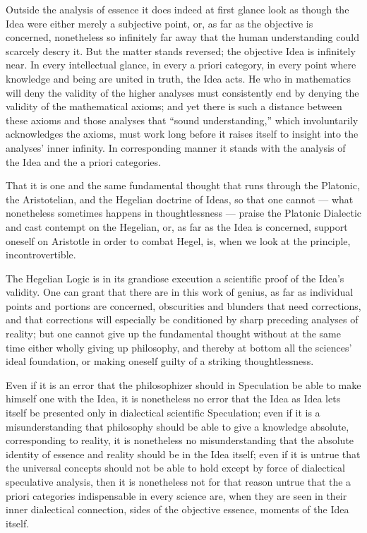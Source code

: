 \documentclass[12pt]{book}
\begin{document}
Outside the analysis of essence it does indeed at first glance look as though the Idea were either merely
a subjective point, or, as far as the objective is concerned, nonetheless so infinitely far away that the
human understanding could scarcely descry it. But the matter stands reversed; the objective Idea is
infinitely near. In every intellectual glance, in every a priori category, in every point where knowledge
and being are united in truth, the Idea acts.
He who in mathematics will deny the validity of the higher analyses must consistently end by denying the
validity of the mathematical axioms; and yet there is such a distance between these axioms and those
analyses that ``sound understanding,'' which involuntarily acknowledges the axioms, must work long before
it raises itself to insight into the analyses' inner infinity. In corresponding manner it stands with the
analysis of the Idea and the a priori categories.

That it is one and the same fundamental thought that runs through the Platonic, the Aristotelian, and the
Hegelian doctrine of Ideas, so that one cannot --- what nonetheless sometimes happens in thoughtlessness
--- praise the Platonic Dialectic and cast contempt on the Hegelian, or, as far as the Idea is concerned,
support oneself on Aristotle in order to combat Hegel, is, when we look at the principle, incontrovertible.

The Hegelian Logic is in its grandiose execution a scientific proof of the Idea's validity. One can grant
that there are in this work of genius, as far as individual points and portions are concerned, obscurities
and blunders that need corrections, and that corrections will especially be conditioned by sharp preceding
analyses of reality; but one cannot give up the fundamental thought without at the same time either wholly
giving up philosophy, and thereby at bottom all the sciences' ideal foundation, or making oneself guilty
of a striking thoughtlessness.

Even if it is an error that the philosophizer should in Speculation be able to make himself one with the
Idea, it is nonetheless no error that the Idea as Idea lets itself be presented only in dialectical
scientific Speculation; even if it is a misunderstanding that philosophy should be able to give a knowledge
absolute, corresponding to reality, it is nonetheless no misunderstanding that the absolute identity of
essence and reality should be in the Idea itself; even if it is untrue that the universal concepts should
not be able to hold except by force
of dialectical speculative analysis, then it is nonetheless not for that reason untrue that the a priori
categories indispensable in every science are, when they are seen in their inner dialectical connection,
sides of the objective essence, moments of the Idea itself.
\end{document}
